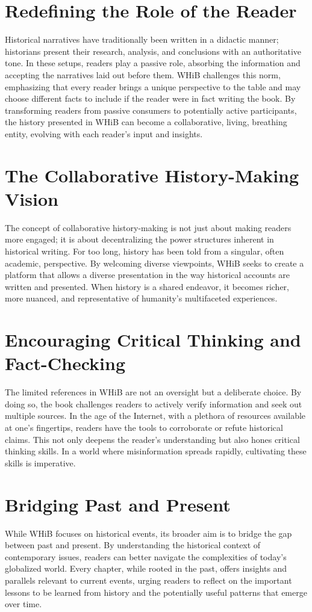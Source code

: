 \documentclass[a4paper,12pt]{book}
\begin{document}
\section*{Redefining the Role of the Reader}
Historical narratives have traditionally been written in a didactic manner; historians present their research, analysis, and conclusions with an authoritative tone. In these setups, readers play a passive role, absorbing the information and accepting the narratives laid out before them. WHiB challenges this norm, emphasizing that every reader brings a unique perspective to the table and may choose different facts to include if the reader were in fact writing the book. By transforming readers from passive consumers to potentially active participants, the history presented in WHiB can become a collaborative, living, breathing entity, evolving with each reader's input and insights.

\section*{The Collaborative History-Making Vision}
The concept of collaborative history-making is not just about making readers more engaged; it is about decentralizing the power structures inherent in historical writing. For too long, history has been told from a singular, often academic, perspective. By welcoming diverse viewpoints, WHiB seeks to create a platform that allows a diverse presentation in the way historical accounts are written and presented. When history is a shared endeavor, it becomes richer, more nuanced, and representative of humanity's multifaceted experiences.

\section*{Encouraging Critical Thinking and Fact-Checking}
The limited references in WHiB are not an oversight but a deliberate choice. By doing so, the book challenges readers to actively verify information and seek out multiple sources. In the age of the Internet, with a plethora of resources available at one's fingertips, readers have the tools to corroborate or refute historical claims. This not only deepens the reader's understanding but also hones critical thinking skills. In a world where misinformation spreads rapidly, cultivating these skills is imperative.

\section*{Bridging Past and Present}
While WHiB focuses on historical events, its broader aim is to bridge the gap between past and present. By understanding the historical context of contemporary issues, readers can better navigate the complexities of today's globalized world. Every chapter, while rooted in the past, offers insights and parallels relevant to current events, urging readers to reflect on the important lessons to be learned from history and the potentially useful patterns that emerge over time.
\end{document}
